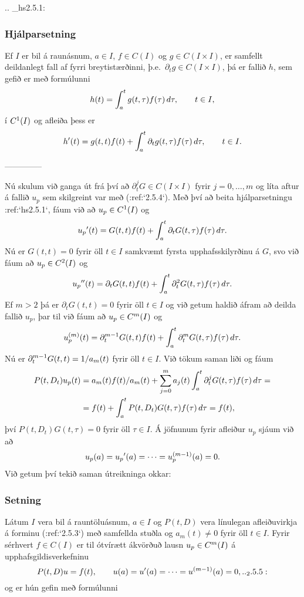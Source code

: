 .. _hs2.5.1:

\subsubsection{Hjálparsetning}
Ef $I$ er bil á raunásnum, $a\in I$, $f\in C(I)$ og $g\in
C(I\times I)$, er samfellt deildanlegt fall af fyrri breytistærðinni,
þ.e.~${\partial}_tg\in C(I\times I)$,  þá
er fallið $h$, sem gefið er með formúlunni  
 $$h(t)=\int_a\sp t g(t, \tau)f(\tau) \, d\tau, \qquad t\in I,
 $$
í $C\sp 1(I)$ og afleiða þess er 
 $$h{\sp{\prime}}(t)=g(t,t)f(t)+\int_a\sp t \partial_tg(t,\tau)f(\tau) \, d\tau,
\qquad t\in I.
 $$


--------------



Nú skulum við ganga út frá því að $\partial_t^{j}G\in C(I\times I)$ 
fyrir $j=0,\dots,m$ og líta
aftur á fallið $u_p$ sem skilgreint var með (:ref:`2.5.4`). 
Með því að beita hjálparsetningu :ref:`hs2.5.1`, fáum við að $u_p\in C\sp
1(I)$  og
 $$u_p{\sp{\prime}}(t) = G(t,t)f(t)+\int_a\sp t \partial_t G(t,\tau)f(\tau) \, d\tau.
 $$
Nú er $G(t,t)=0$ fyrir öll $t\in I$ samkvæmt fyrsta upphafsskilyrðinu
á $G$, svo við fáum að $u_p\in C\sp 2(I)$ og
 $$u_p{\sp{\prime\prime}}(t) = \partial_tG(t,t)f(t)
+\int_a\sp t \partial_t^2G(t,\tau)f(\tau) \, d\tau.
 $$
Ef $m > 2$ þá er $\partial_tG(t,t)=0$ fyrir öll $t\in I$
og við getum haldið áfram að deilda fallið $u_p$, þar til við fáum að
$u_p\in C\sp m(I)$ og  
 $$
u_p\sp{(m)}(t) = \partial_t^{m-1}G(t,t)f(t)+\int_a\sp t
\partial_t^mG(t,\tau)f(\tau) \, d\tau. 
 $$
Nú er $\partial_t\sp{m-1}G(t,t)=1/a_m(t)$ fyrir öll $t\in I$.  
Við tökum saman liði og fáum
\begin{align*}
P(t,D_t)u_p(t)&=
a_m(t)f(t)/a_m(t) +\sum\limits_{j=0}\sp m
a_j(t)\int_a\sp t \partial_t^jG(t,\tau)f(\tau)\, d\tau=\\
&=f(t)+\int_a\sp t P(t,D_t)G(t,\tau)f(\tau)\, d\tau=f(t),
\end{align*}
því $P(t,D_t)G(t,\tau)=0$ fyrir öll $\tau\in I$. Á jöfnunum fyrir
afleiður $u_p$ sjáum við að  
$$u_p(a)=u_p{\sp{\prime}}(a)=\cdots=u_p\sp{(m-1)}(a)=0.$$
 Við getum því tekið saman útreikninga okkar:

\subsubsection{Setning}
Látum $I$ vera bil á rauntöluásnum,  $a\in I$ og $P(t,D)$ vera
línu\-legan afleiðuvirkja á forminu (:ref:`2.5.3`) með samfellda stuðla
og $a_m(t)\neq 0$ fyrir öll $t\in I$. 
Fyrir sérhvert $f\in C(I)$ er til ótvírætt ákvörðuð lausn $u_p\in
C\sp m(I)$ á
upphafsgildisverkefninu 
 \begin{equation*}P(t,D)u=f(t), \qquad u(a)=u\dash(a)=\cdots=u\sp{(m-1)}(a)=0,

.. _2.5.5:

 \end{equation*}
og er hún gefin með formúlunni

